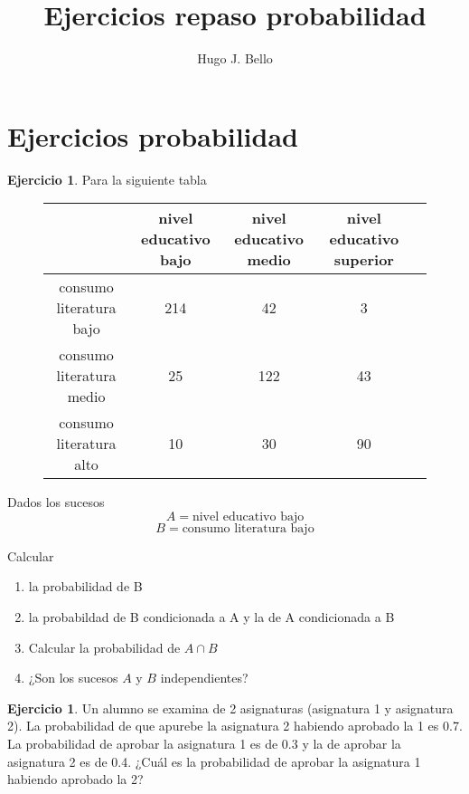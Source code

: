 \documentclass[]{article}
\title{Ejercicios repaso probabilidad}
\author{Hugo J. Bello}
\date{}
\theoremstyle{plain}
\theoremstyle{definition}
\newtheorem{exercise}[theorem]{Ejercicio}
\theoremstyle{definition} %
\begin{document}
\maketitle
\section{Ejercicios probabilidad}



\begin{exercise}
  Para la siguiente tabla
  \begin{figure}
    \centering
    \begin{tabular}{c|ccc|c}
                         &nivel educativo bajo&nivel educativo medio&nivel educativo superior \\
       \hline
       consumo literatura bajo         &214          &42                &3                    \\
       consumo literatura medio        &25           &122               &43                   \\
       consumo literatura alto         &10            &30                &90                  \\
      \end{tabular}
  \end{figure}

  Dados los sucesos
  \[A=\text{nivel educativo bajo}\]
  \[B=\text{consumo literatura bajo}\]

  Calcular 
  \begin{enumerate}
    \item la probabilidad de B
    \item la probabildad de B condicionada a A y la de A condicionada a B
    \item Calcular la probabilidad de $A\cap B$
    \item  ¿Son los sucesos $A$ y $B$ independientes?

  \end{enumerate}
\end{exercise}

\begin{exercise}
  Un alumno se examina de 2 asignaturas (asignatura 1 y asignatura 2). 
  La probabilidad de que apurebe la asignatura 2 habiendo aprobado la 1 es 0.7. La probabilidad de aprobar 
  la asignatura 1 es de 0.3 y la de aprobar la asignatura 2 es de 0.4. 
  ¿Cuál es la probabilidad de aprobar la asignatura 1 habiendo aprobado la 2?
\end{exercise}
\end{document}
